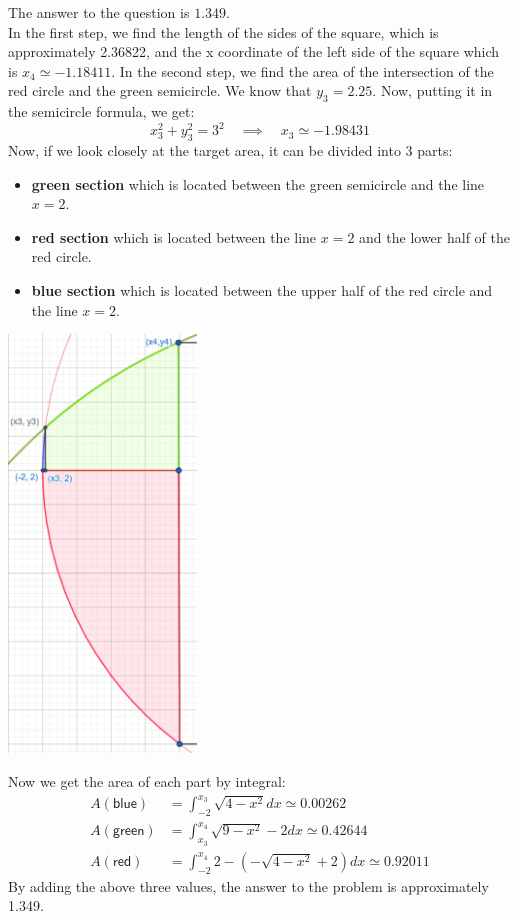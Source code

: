 \begin{solution}
The answer to the question is $1.349$.\\[0.2cm]
 \noindent In the first step, we find the length of the sides of the square, which is approximately 2.36822, and the x coordinate of the left side of the square which is $x_4 \simeq -1.18411$. In the second step, we find the area of the intersection of the red circle and the green semicircle. We know that $y_3 = 2.25$. Now, putting it in the semicircle formula, we get: $$ x_3^2+y_3^2 = 3^2 \quad \implies \quad x_3 \simeq -1.98431 $$ Now, if we look closely at the target area, it can be divided into 3 parts: 
 \begin{itemize}
 \item \textbf{green section} which is located between the green semicircle and the line $x=2$. 
 \item \textbf{red section} which is located between the line $x=2$ and the lower half of the red circle. 
 \item \textbf{blue section} which is located between the upper half of the red circle and the line $x=2$. 
 \end{itemize}
\begin{center}
	\includegraphics[width=5cm]{25/figs/25_diagram4.png}
\end{center}
 
 Now we get the area of each part by integral: $$ \begin{aligned} A(\textsf{blue}) &= \int_{-2}^{x_3}\sqrt{4-x^2}dx \simeq 0.00262 \\ A(\textsf{green}) &= \int_{x_3}^{x_4}\sqrt{9-x^2}-2 dx \simeq 0.42644 \\ A(\textsf{red}) &= \int_{-2}^{x_4}2 - (-\sqrt{4-x^2} + 2) dx \simeq 0.92011 \end{aligned} $$ By adding the above three values, the answer to the problem is approximately 1.349.\end{solution}